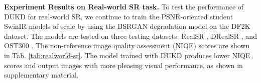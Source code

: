 \documentclass[10pt,twocolumn,letterpaper]{article}
\newcommand{\red}[1]{{\color{black}#1}}
\begin{document}
\red{
\noindent\textbf{Experiment Results on Real-world SR task. } 
To test the performance of DUKD for real-world SR, we continue to train the PSNR-oriented student SwinIR models of \texttimes 4 scale by using the BSRGAN degradation model \cite{zhang2021designing, liang2021swinir} on the DF2K dataset. The models are tested on three testing datasets: RealSR \cite{cai2019toward}, DRealSR \cite{wei2020component}, and OST300 \cite{wang2018recovering}. The non-reference image quality assessment (NIQE) \cite{mittal2012making}
scores are
shown in Tab. \ref{tab:realworld-sr}. The model trained with DUKD produces lower NIQE scores and output images with more pleasing visual performance, as shown in supplementary material.
}



\begin{table}[]
\caption{NIQE scores on several real-world SR testing datasets. The lower, the better. Visual comparisons are provided in the supplementary material.}\vspace{-0.5em}
\label{tab:realworld-sr}
\centering
{}
\end{table} 
\end{document}
